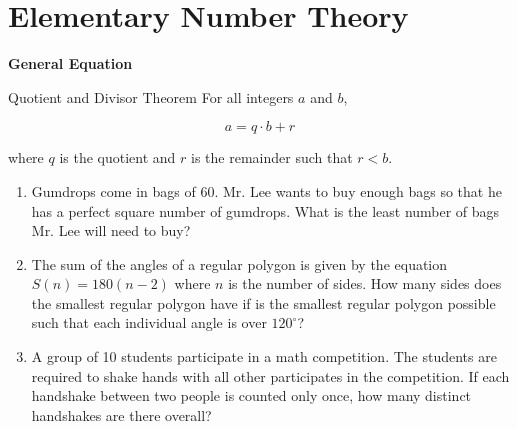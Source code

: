 \section{Elementary Number Theory}

\textbf{General Equation}

\bigskip
\begin{equationbox}{Quotient and Divisor Theorem}
For all integers $a$ and $b$,

\[a=q\cdot b+r\]

where $q$ is the quotient and $r$ is the remainder such that $r<b$.

\end{equationbox}

\bigskip
\begin{enumerate}[labelindent=*,style=multiline,leftmargin=*,label=\textbf{Example \arabic*:}]
\item Gumdrops come in bags of 60. Mr. Lee wants to buy enough bags so that he has a perfect square number of gumdrops. What is the least number of bags Mr. Lee will need to buy?

\vfill\item The sum of the angles of a regular polygon is given by the equation $S(n)=180(n-2)$ where $n$ is the number of sides. How many sides does the smallest regular polygon have if is the smallest regular polygon possible such that each individual angle is over $120^\circ$?

\vfill\item A group of 10 students participate in a math competition. The students are required to shake hands with all other participates in the competition. If each handshake between two people is counted only once, how many distinct handshakes are there overall?
\end{enumerate}

